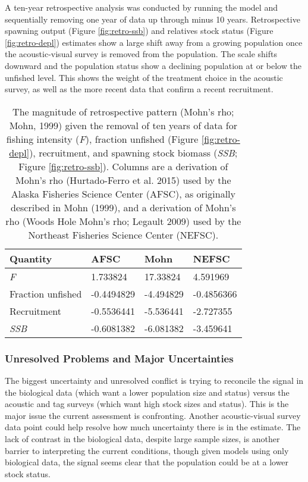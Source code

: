 \documentclass[11pt,
  english,
  letterpaper,
]{article}
\begin{document}
A ten-year retrospective analysis was conducted by running the model and sequentially removing one year of data up through minus 10 years. Retrospective spawning output (Figure \ref{fig:retro-ssb}) and relatives stock status (Figure \ref{fig:retro-depl}) estimates show a large shift away from a growing population once the acoustic-visual survey is removed from the population. The scale shifts downward and the population status show a declining population at or below the unfished level. This shows the weight of the treatment choice in the acoustic survey, as well as the more recent data that confirm a recent recruitment.

\begin{longtable}[t]{llll}
\caption{\label{tab:RetroMohnsrho}The magnitude of retrospective pattern (Mohn's rho; Mohn, 1999) given the removal of ten years of data for fishing intensity (\emph{F}), fraction unfished (Figure \ref{fig:retro-depl}),  recruitment, and spawning stock biomass (\emph{SSB}; Figure \ref{fig:retro-ssb}). Columns are a derivation of Mohn's rho (Hurtado-Ferro et al. 2015) used by the Alaska Fisheries Science Center (AFSC), as originally described in Mohn (1999), and a derivation of Mohn's rho (Woods Hole Mohn's rho; Legault 2009) used by the Northeast Fisheries Science Center (NEFSC).}\\
\toprule
Quantity & AFSC & Mohn & NEFSC\\
\midrule
\emph{F} & 1.733824 & 17.33824 & 4.591969\\
Fraction unfished & -0.4494829 & -4.494829 & -0.4856366\\
Recruitment & -0.5536441 & -5.536441 & -2.727355\\
\emph{SSB} & -0.6081382 & -6.081382 & -3.459641\\
\bottomrule
\end{longtable}

\hypertarget{unresolved-problems-and-major-uncertainties-1}{%
\subsubsection{Unresolved Problems and Major Uncertainties}\label{unresolved-problems-and-major-uncertainties-1}}

The biggest uncertainty and unresolved conflict is trying to reconcile the signal in the biological data (which want a lower population size and status) versus the acoustic and tag surveys (which want high stock sizes and status). This is the major issue the current assessment is confronting. Another acoustic-visual survey data point could help resolve how much uncertainty there is in the estimate. The lack of contrast in the biological data, despite large sample sizes, is another barrier to interpreting the current conditions, though given models using only biological data, the signal seems clear that the population could be at a lower stock status.
\end{document}
